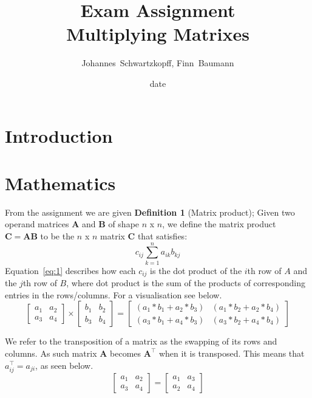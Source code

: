\documentclass[12pt, a4paper]{article}
\title{%
  Exam Assignment \\
  \large Multiplying Matrixes \\}
\author{Johannes~Schwartzkopff, Finn~Baumann }
\date{date}
\begin{document}
\maketitle

\section{Introduction}

\section{Mathematics}
From the assignment we are given \textbf{Definition 1} (Matrix product); Given two operand matrices $\mathbf{A}$ and $\mathbf{B}$ of shape $n$ x $n$, we define the matrix product $\mathbf{C} = \mathbf{AB}$ to be the $n$ x $n$ matrix $\mathbf{C}$ that satisfies:
\begin{equation}
    c_{ij}\sum_{k=1}^{n} a_{ik}b_{kj}
    \label{eq:1}
\end{equation}
Equation~\ref{eq:1} describes how each $c_{ij}$ is the dot product of the $i$th row of $A$ and the $j$th row of $B$, where dot product is the sum of the products of corresponding entries in the rows/columns. For a visualisation see below.
  $$
     \begin{bmatrix}
         a_1 & a_2\\ 
         a_3 & a_4 
     \end{bmatrix}
     \times
     \begin{bmatrix}
         b_1 & b_2\\ 
         b_3 & b_4  
     \end{bmatrix}
      =
     \begin{bmatrix}
         (a_1*b_1+a_2*b_3) & (a_1*b_2+a_2*b_4)\\ 
         (a_3*b_1+a_4*b_3) & (a_3*b_2+a_4*b_4)   
     \end{bmatrix}
  $$
\bigskip

We refer to the transposition of a matrix as the swapping of its rows and columns. As such matrix $\mathbf{A}$ becomes $\mathbf{A}^\top$ when it is transposed. This means that $a^{\top}_{ij}=a_{ji}$, as seen below.
  $$
     \begin{bmatrix}
         a_1 & a_2\\ 
         a_3 & a_4 
     \end{bmatrix}
     =
     \begin{bmatrix}
     a_1 & a_3\\
     a_2 & a_4
     \end{bmatrix}
 $$ 
\end{document}
